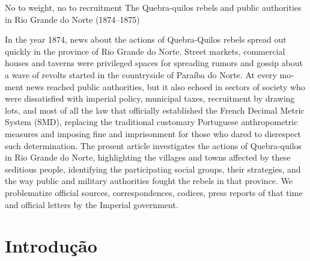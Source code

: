 \begin{refsection}
\begin{otherlanguage}{english}
\fakeChapterTwoLines
{No to weight, no to recruitment} {The Quebra-quilos rebels and public authorities in Rio Grande do Norte (1874--1875)}

\begin{galoResumo}[Abstract]
    In the year 1874, news about the actions of Quebra-Quilos rebels spread out quickly in the province of Rio Grande do Norte. Street markets, commercial houses and taverns were privileged spaces for spreading rumors and gossip about a wave of revolts started in the countryside of Paraíba do Norte. At every moment news reached public authorities, but it also echoed in sectors of society who were dissatisfied with imperial policy, municipal taxes, recruitment by drawing lots, and most of all the law that officially established the French Decimal Metric System (SMD), replacing the traditional customary Portuguese anthropometric measures and imposing fine and imprisonment for those who dared to disrespect such determination. The present article investigates the actions of Quebra-quilos in Rio Grande do Norte, highlighting the villages and towns affected by these seditious people, identifying the participating social groups, their strategies, and the way public and military authorities fought the rebels in that province. We problematize official sources, correspondences, codices, press reports of that time and official letters by the Imperial government.
\end{galoResumo}

\end{otherlanguage}

\section{Introdução}


\end{refsection}
